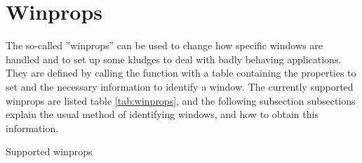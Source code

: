 \section{Winprops}
\label{sec:winprops}

The so-called ''winprops'' can be used to change how
specific windows are handled and to set up some kludges to deal with
badly behaving applications. They are defined by calling the function
 with a table containing the properties to set and the
necessary information to identify a window. The currently supported
winprops are listed table \ref{tab:winprops}, and the following
subsection subsections explain the usual method of identifying windows,
and how to obtain this information.

\begin{table}
\begin{htmlonly}
\docode %
\end{htmlonly}
\caption{Supported winprops}
\label{tab:winprops}



\end{table}
